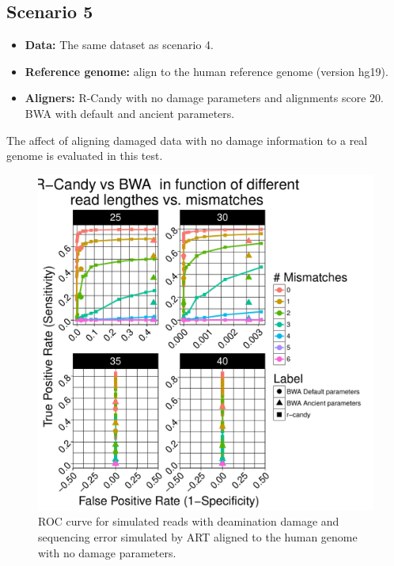 \documentclass[11pt,a4paper]{report}
\begin{document}
\subsection{Scenario 5}
 
  \begin{itemize}

   \item \textbf{Data:} The same dataset as scenario 4.
     
   \item \textbf{Reference genome:} align to the human reference genome (version hg19).
   
    \item \textbf{Aligners:} R-Candy with no damage parameters and alignments score 20. \\
BWA with default and ancient parameters.
  \end{itemize}
 

The affect of aligning  damaged data with no damage information to a real genome is evaluated in this test.



\begin{figure}[H]
\centering
\includegraphics[width=12cm]{pictures/bROC_DS5_ART.pdf}
\caption{ROC curve for simulated reads with deamination damage and sequencing error simulated by ART aligned to the human genome
         with no damage parameters.}
\label{DS5_ART}
\end{figure}
\end{document}

